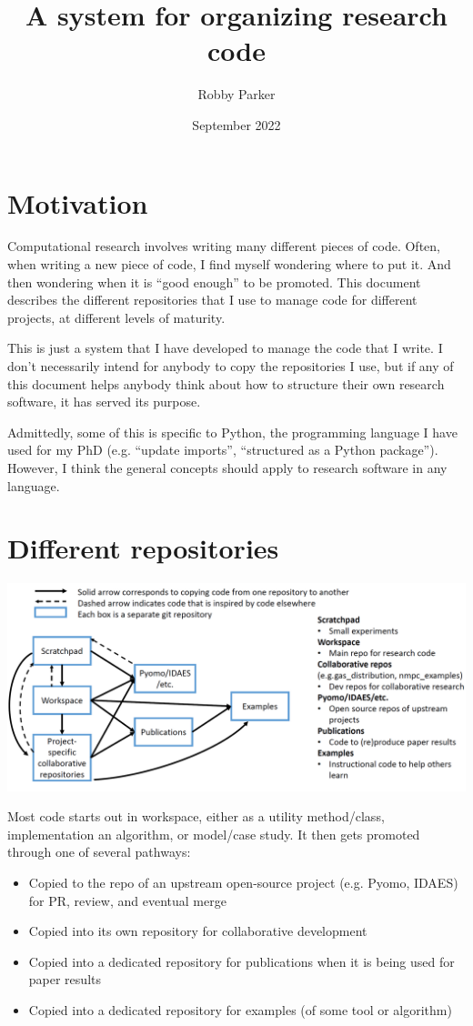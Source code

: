 \documentclass{article}
\title{A system for organizing research code}
\author{Robby Parker}
\date{September 2022}
\begin{document}
\maketitle

\section{Motivation}
Computational research involves writing many different pieces of code.
Often, when writing a new piece of code, I find myself wondering where
to put it. And then wondering when it is ``good enough'' to be promoted.
This document describes the different repositories that I
use to manage code for different projects, at different levels of
maturity.

This is just a system that I have developed to manage the code that
I write. I don't necessarily intend for anybody to copy the repositories
I use, but if any of this document helps anybody think about how to
structure their own research software, it has served its purpose.

Admittedly, some of this is specific to Python, the programming language
I have used for my PhD (e.g. ``update imports'', ``structured as a
Python package''). However, I think the general concepts should apply to
research software in any language.

\section{Different repositories}

\hspace{-1.5cm}\includegraphics[width=15cm]{repo_diagram}

Most code starts out in workspace, either as a utility method/class,
implementation an algorithm, or model/case study.
It then gets promoted through one of several pathways:
\begin{itemize}
  \item Copied to the repo of an upstream open-source project (e.g. Pyomo,
    IDAES) for PR, review, and eventual merge
  \item Copied into its own repository for collaborative development
  \item Copied into a dedicated repository for publications when it is
    being used for paper results
  \item Copied into a dedicated repository for examples (of some tool
    or algorithm)
\end{itemize}
\end{document}
